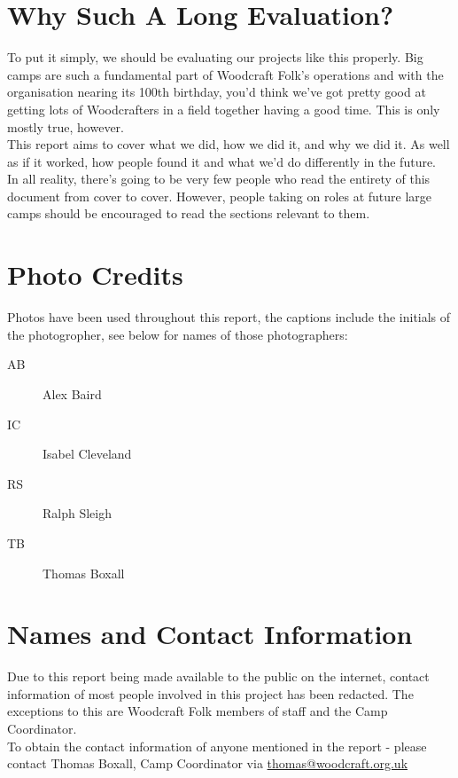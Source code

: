 \section{Why Such A Long Evaluation?}
To put it simply, we should be evaluating our projects like this properly. Big camps are such a fundamental part of Woodcraft Folk's operations and with the organisation nearing its 100th birthday, you'd think we've got pretty good at getting lots of Woodcrafters in a field together having a good time. This is only mostly true, however.\\

This report aims to cover what we did, how we did it, and why we did it. As well as if it worked, how people found it and what we'd do differently in the future. \\

In all reality, there's going to be very few people who read the entirety of this document from cover to cover. However, people taking on roles at future large camps should be encouraged to read the sections relevant to them. 

\section{Photo Credits}
Photos have been used throughout this report, the captions include the initials of the photogropher, see below for names of those photographers:
\begin{description}
    \item[AB] Alex Baird
    \item[IC] Isabel Cleveland
    \item[RS] Ralph Sleigh
    \item[TB] Thomas Boxall
\end{description}

\section{Names and Contact Information}
Due to this report being made available to the public on the internet, contact information of most people involved in this project has been redacted. The exceptions to this are Woodcraft Folk members of staff and the Camp Coordinator.\\

To obtain the contact information of anyone mentioned in the report - please contact Thomas Boxall, Camp Coordinator via \href{mailto:thomas@woodcraft.org.uk}{thomas@woodcraft.org.uk}
